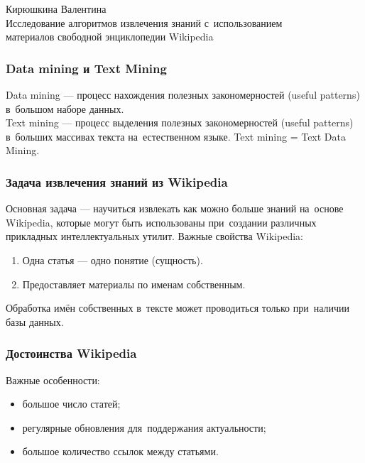 \documentclass{beamer}
\begin{document}
\begin{frame}
\begin{center}
Кирюшкина Валентина \\
\vspace{1cm}
{\Large Исследование алгоритмов извлечения знаний с~использованием\\ 
материалов свободной энциклопедии Wikipedia}\\ 
\end{center}
\end{frame}

\begin{frame}
\frametitle{Data mining и Text Mining}
Data mining --- процесс нахождения полезных закономерностей (useful patterns)  в~большом наборе данных.\\
\vspace{1cm}
Text mining --- процесс выделения полезных закономерностей (useful patterns) 
в~больших массивах текста на~естественном языке. 
Text mining = Text Data Mining.
\end{frame}

\begin{frame}
\frametitle{Задача извлечения знаний из Wikipedia}
Основная задача --- научиться извлекать как можно больше знаний на~основе Wikipedia,
которые могут быть использованы  при~создании различных прикладных интеллектуальных утилит.
Важные свойства Wikipedia:

\begin{enumerate}

\item {Одна статья --- одно понятие (сущность).}
\item{Предоставляет материалы по именам собственным.}

\end{enumerate}

Обработка имён собственных в~тексте может проводиться только при~наличии базы данных.

\end{frame}

\begin{frame}
\frametitle{Достоинства Wikipedia}

Важные особенности:
\begin{itemize}
\item{большое число статей;}
\item{регулярные обновления для~поддержания актуальности;}
\item{большое количество ссылок между статьями.}
\end{itemize}

\end{frame}
\end{document}
